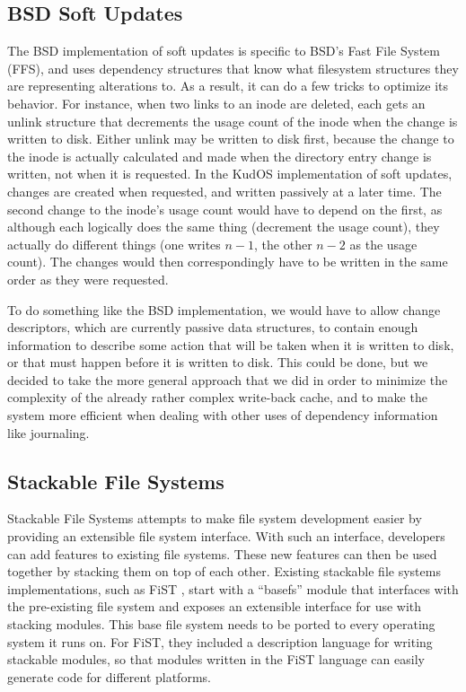 \subsection{BSD Soft Updates}
\label{sec:related:soft}

The BSD implementation of soft updates \cite{ganger00soft} is specific to BSD's
Fast File System (FFS), and uses dependency structures that know what filesystem
structures they are representing alterations to. As a result, it can do a few
tricks to optimize its behavior. For instance, when two links to an inode are
deleted, each gets an unlink structure that decrements the usage count of the
inode when the change is written to disk. Either unlink may be written to disk
first, because the change to the inode is actually calculated and made when the
directory entry change is written, not when it is requested. In the KudOS
implementation of soft updates, changes are created when requested, and written
passively at a later time. The second change to the inode's usage count would
have to depend on the first, as although each logically does the same thing
(decrement the usage count), they actually do different things (one writes $n -
1$, the other $n - 2$ as the usage count). The changes would then
correspondingly have to be written in the same order as they were requested.

To do something like the BSD implementation, we would have to allow change
descriptors, which are currently passive data structures, to contain enough
information to describe some action that will be taken when it is written to
disk, or that must happen before it is written to disk. This could be done, but
we decided to take the more general approach that we did in order to minimize
the complexity of the already rather complex write-back cache, and to make the
system more efficient when dealing with other uses of dependency information
like journaling.

\subsection{Stackable File Systems}
\label{sec:related:sfs}

Stackable File Systems \cite{heidemann93stack} attempts to make file system
development easier by providing an extensible file system interface. With such
an interface, developers can add features to existing file systems. These new
features can then be used together by stacking them on top of each other.
Existing stackable file systems implementations, such as FiST
\cite{zadok00fist}, start with a ``basefs'' module that interfaces with the
pre-existing file system and exposes an extensible interface for use with
stacking modules. This base file system needs to be ported to every operating
system it runs on. For FiST, they included a description language for writing
stackable modules, so that modules written in the FiST language can easily
generate code for different platforms.

